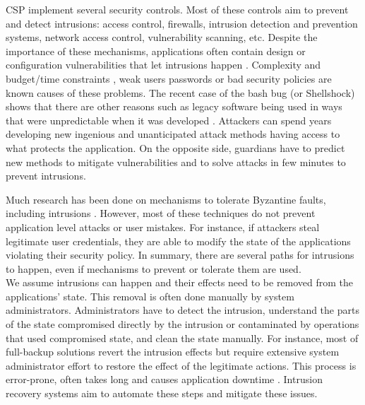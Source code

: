 \ac{CSP} implement several security controls. Most of these controls aim to prevent and detect intrusions: access control, firewalls, intrusion detection and prevention systems, network access control, vulnerability scanning, etc. Despite the importance of these mechanisms, applications often contain design or configuration vulnerabilities that let intrusions happen \cite{Williams2013,Hubbard2010}. Complexity and budget/time constraints \cite{Charette2005}, weak users passwords or bad security policies are known causes of these problems. The recent case of the bash bug (or Shellshock) shows that there are other reasons such as legacy software being used in ways that were unpredictable when it was developed \cite{Sidhpurwala:14}. Attackers can spend years developing new ingenious and unanticipated attack methods having access to what protects the application. On the opposite side, guardians have to predict new methods to mitigate vulnerabilities and to solve attacks in few minutes to prevent intrusions.

Much research has been done on mechanisms to tolerate Byzantine faults, including intrusions \cite{Castro2002,Verissimo2003,Gupta:03}. However, most of these techniques do not prevent application level attacks or user mistakes. For instance, if attackers steal legitimate user credentials, they are able to modify the state of the applications violating their security policy. In summary, there are several paths for intrusions to happen, even if mechanisms to prevent or tolerate them are used.\\ %

We assume intrusions can happen and their effects need to be removed from the applications' state. This removal is often done manually by system administrators. Administrators have to detect the intrusion, understand the parts of the state compromised directly by the intrusion or contaminated by operations that used compromised state, and clean the state manually. For instance, most of full-backup solutions revert the intrusion effects but require extensive system administrator effort to restore the effect of the legitimate actions. This process is error-prone, often takes long and causes application downtime \cite{Brown2001}. Intrusion recovery systems aim to automate these steps and mitigate these issues.

